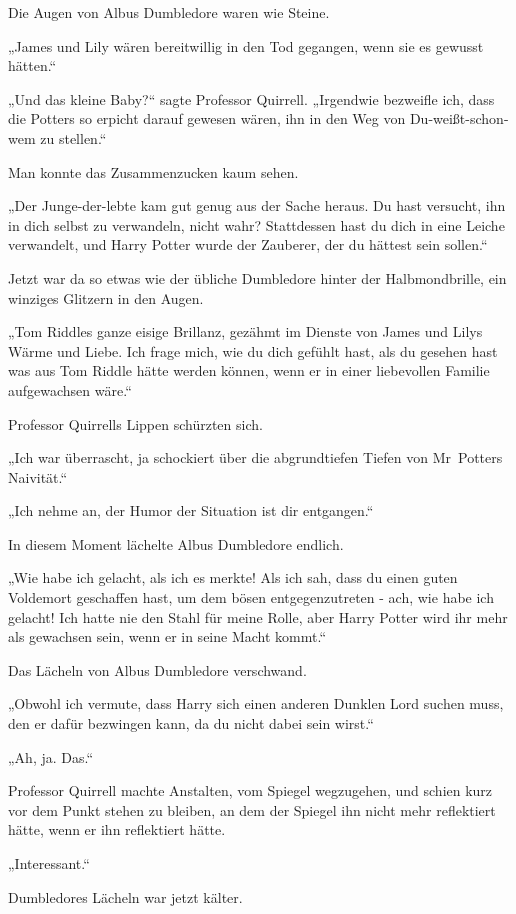 {Die Augen von Albus Dumbledore waren wie Steine.

„James und Lily wären bereitwillig in den Tod gegangen, wenn sie es gewusst hätten.“

„Und das kleine Baby?“ sagte Professor Quirrell. „Irgendwie bezweifle ich, dass die Potters so erpicht darauf gewesen wären, ihn in den Weg von Du-weißt-schon-wem zu stellen.“

Man konnte das Zusammenzucken kaum sehen.

„Der Junge-der-lebte kam gut genug aus der Sache heraus. Du hast versucht, ihn in dich selbst zu verwandeln, nicht wahr? Stattdessen hast du dich in eine Leiche verwandelt, und Harry Potter wurde der Zauberer, der du hättest sein sollen.“

Jetzt war da so etwas wie der übliche Dumbledore hinter der Halbmondbrille, ein winziges Glitzern in den Augen.

„Tom Riddles ganze eisige Brillanz, gezähmt im Dienste von James und Lilys Wärme und Liebe. Ich frage mich, wie du dich gefühlt hast, als du gesehen hast was aus Tom Riddle hätte werden können, wenn er in einer liebevollen Familie aufgewachsen wäre.“

Professor Quirrells Lippen schürzten sich.

„Ich war überrascht, ja schockiert über die abgrundtiefen Tiefen von Mr~Potters Naivität.“

„Ich nehme an, der Humor der Situation ist dir entgangen.“

In diesem Moment lächelte Albus Dumbledore endlich.

„Wie habe ich gelacht, als ich es merkte! Als ich sah, dass du einen guten Voldemort geschaffen hast, um dem bösen entgegenzutreten - ach, wie habe ich gelacht! Ich hatte nie den Stahl für meine Rolle, aber Harry Potter wird ihr mehr als gewachsen sein, wenn er in seine Macht kommt.“

Das Lächeln von Albus Dumbledore verschwand.

„Obwohl ich vermute, dass Harry sich einen anderen Dunklen Lord suchen muss, den er dafür bezwingen kann, da du nicht dabei sein wirst.“

„Ah, ja. Das.“

Professor Quirrell machte Anstalten, vom Spiegel wegzugehen, und schien kurz vor dem Punkt stehen zu bleiben, an dem der Spiegel ihn nicht mehr reflektiert hätte, wenn er ihn reflektiert hätte.

„Interessant.“

Dumbledores Lächeln war jetzt kälter.

}
